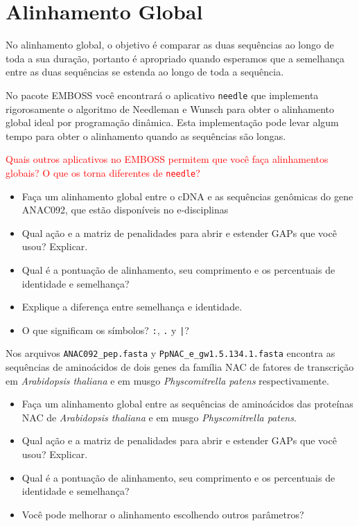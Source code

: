 \documentclass[letter,11pt]{book}
\begin{document}
\section{Alinhamento Global}

No alinhamento global, o objetivo é comparar as duas sequências ao longo de toda a sua duração, portanto é apropriado quando esperamos que a semelhança entre as duas sequências se estenda ao longo de toda a sequência.

No pacote EMBOSS você encontrará o aplicativo \Verb+needle+ que implementa rigorosamente o algoritmo de Needleman e Wunsch \citep{Needleman1970} para obter o alinhamento global ideal por programação dinâmica. Esta implementação pode levar algum tempo para obter o alinhamento quando as sequências são longas.

\textcolor{red}{Quais outros aplicativos no EMBOSS permitem que você faça alinhamentos globais? O que os torna diferentes de \Verb+needle+?}

{\color{red}
\begin{itemize}
\item Faça um alinhamento global entre o cDNA e as sequências genômicas do gene ANAC092, que estão disponíveis no e-disciplinas
\item Qual ação e a matriz de penalidades para abrir e estender GAPs que você usou? Explicar.
\item Qual é a pontuação de alinhamento, seu comprimento e os percentuais de identidade e semelhança?
\item Explique a diferença entre semelhança e identidade.
\item O que significam os símbolos? \Verb+:+, \Verb+.+ y \Verb+|+?
\end{itemize}
}

Nos arquivos \Verb+ANAC092_pep.fasta+ y \Verb+PpNAC_e_gw1.5.134.1.fasta+ encontra as sequências de aminoácidos de dois genes da família NAC de fatores de transcrição em \textit{Arabidopsis thaliana} e em musgo \textit{Physcomitrella patens} respectivamente.

{\color{red}
\begin{itemize}
\item Faça um alinhamento global entre as sequências de aminoácidos das proteínas NAC de \textit{Arabidopsis thaliana} e em musgo \textit{Physcomitrella patens}.
\item Qual ação e a matriz de penalidades para abrir e estender GAPs que você usou? Explicar.
\item Qual é a pontuação de alinhamento, seu comprimento e os percentuais de identidade e semelhança?
\item Você pode melhorar o alinhamento escolhendo outros parâmetros?
\end{itemize}
}
\end{document}
